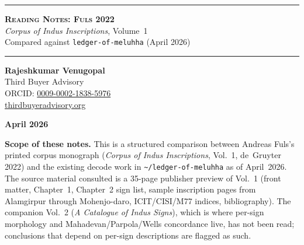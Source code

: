 \documentclass[12pt, a4paper]{article}
\newcommand{\db}[1]{\texttt{#1}}
\begin{document}
\thispagestyle{empty}

\begin{titlepage}
\centering
\vspace*{1.6cm}

{\color{deepnavy}\rule{\linewidth}{1.5pt}}
\vspace{0.5cm}

{\color{deepnavy}\LARGE\bfseries\scshape
  Reading Notes: Fuls 2022}\\[0.4em]
{\color{midnavy}\large
  \textit{Corpus of Indus Inscriptions}, Volume~1\\
  Compared against \texttt{ledger-of-meluhha} (April 2026)}

\vspace{0.5cm}
{\color{deepnavy}\rule{\linewidth}{0.5pt}}

\vspace{1.3cm}

{\large\bfseries Rajeshkumar Venugopal}\\[0.4em]
{\normalsize Third Buyer Advisory}\\[0.2em]
{\normalsize ORCID: \href{https://orcid.org/0009-0002-1838-5976}{0009-0002-1838-5976}}\\[0.2em]
{\normalsize \href{https://thirdbuyeradvisory.org}{thirdbuyeradvisory.org}}

\vspace{0.9cm}
{\normalsize \textbf{April 2026}}

\vspace{1.4cm}

\begin{mdframed}[
  backgroundcolor=axiomfill,
  linecolor=axiomborder,
  linewidth=1pt,
  innerleftmargin=18pt,
  innerrightmargin=18pt,
  innertopmargin=14pt,
  innerbottommargin=14pt
]
\noindent\textbf{Scope of these notes.}\enspace
This is a structured comparison between
Andreas Fuls's printed corpus monograph
(\textit{Corpus of Indus Inscriptions}, Vol.~1, de~Gruyter 2022)
and the existing decode work in
\db{\textasciitilde/ledger-of-meluhha} as of April~2026.
The source material consulted is a 35-page publisher preview
of Vol.~1 (front matter, Chapter~1, Chapter~2 sign list,
sample inscription pages from Alamgirpur through Mohenjo-daro,
ICIT/CISI/M77 indices, bibliography).
The companion Vol.~2 (\textit{A Catalogue of Indus Signs}),
which is where per-sign morphology and Mahadevan/Parpola/Wells
concordance live, has not been read; conclusions that depend
on per-sign descriptions are flagged as such.


\end{mdframed}
\end{titlepage}
\end{document}
